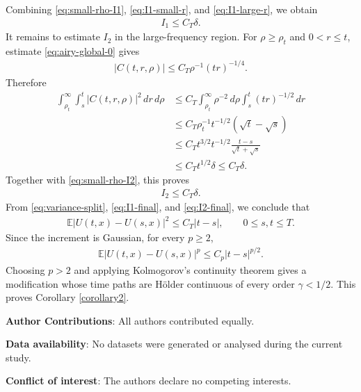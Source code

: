 \documentclass{article}
\begin{document}
Combining \eqref{eq:small-rho-I1}, \eqref{eq:I1-small-r}, and
\eqref{eq:I1-large-r}, we obtain
\begin{align}
  I_1\le C_T\delta.                                  \label{eq:I1-final}
\end{align}
It remains to estimate \(I_2\) in the large-frequency region.  For
\(\rho\ge\rho_t\) and \(0<r\le t\), estimate \eqref{eq:airy-global-0} gives
\begin{align*}
 |C(t,r,\rho)|\le C_T\rho^{-1}(tr)^{-1/4}.
\end{align*}
Therefore
\begin{align*}
\int_{\rho_t}^\infty\int_s^t |C(t,r,\rho)|^2\,dr\,d\rho
&\le C_T\int_{\rho_t}^\infty \rho^{-2}\,d\rho
       \int_s^t (tr)^{-1/2}\,dr                    \\
&\le C_T\rho_t^{-1}t^{-1/2}(\sqrt t-\sqrt s)        \\
&\le C_Tt^{3/2}t^{-1/2}\frac{t-s}{\sqrt t+\sqrt s}  \\
&\le C_Tt^{1/2}\delta
\le C_T\delta.                                      
\end{align*}
Together with \eqref{eq:small-rho-I2}, this proves
\begin{align}
  I_2\le C_T\delta.                                  \label{eq:I2-final}
\end{align}
From \eqref{eq:variance-split}, \eqref{eq:I1-final}, and \eqref{eq:I2-final},
we conclude that
\begin{align*}
  \mathbb E|U(t,x)-U(s,x)|^2\le C_T|t-s|,
  \qquad 0\le s,t\le T.
\end{align*}
Since the increment is Gaussian, for every \(p\ge2\),
\begin{align*}
 \mathbb E|U(t,x)-U(s,x)|^p
 \le C_p |t-s|^{p/2}.
\end{align*}
Choosing \(p>2\) and applying Kolmogorov's continuity theorem gives a
modification whose time paths are Hölder continuous of every order
\(\gamma<1/2\).  This proves Corollary \ref{corollary2}.

\noindent\textbf{Author Contributions}: All authors contributed equally.

\noindent\textbf{Data availability}: No datasets were generated or analysed during the current study.

\noindent\textbf{Conflict of interest}: The authors declare no competing interests.\\



\end{document}
